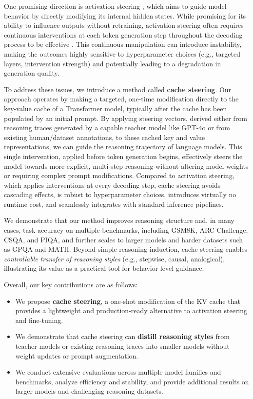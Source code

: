 \documentclass{article} %
\begin{document}
One promising direction is activation steering \citep{turner2308activation, panickssery2023steering}, which aims to guide model behavior by directly modifying its internal hidden states. While promising for its ability to influence outputs without retraining, activation steering often requires continuous interventions at each token generation step throughout the decoding process to be effective \citep{wehner2025taxonomy}. This continuous manipulation can introduce instability, making the outcomes highly sensitive to hyperparameter choices (e.g., targeted layers, intervention strength) and potentially leading to a degradation in generation quality.

To address these issues, we introduce a method called \textbf{cache steering}. Our approach operates by making a targeted, one-time modification directly to the key-value cache of a Transformer model, typically after the cache has been populated by an initial prompt. By applying steering vectors, derived either from reasoning traces generated by a capable teacher model like GPT-4o or from existing human/dataset annotations, to these cached key and value representations, we can guide the reasoning trajectory of language models. This single intervention, applied before token generation begins, effectively steers the model towards more explicit, multi-step reasoning without altering model weights or requiring complex prompt modifications. Compared to activation steering, which applies interventions at every decoding step, cache steering avoids cascading effects, is robust to hyperparameter choices, introduces virtually no runtime cost, and seamlessly integrates with standard inference pipelines.

We demonstrate that our method improves reasoning structure and, in many cases, task accuracy on multiple benchmarks, including GSM8K, ARC-Challenge, CSQA, and PIQA, and further scales to larger models and harder datasets such as GPQA and MATH. Beyond simple reasoning induction, cache steering enables \textit{controllable transfer of reasoning styles} (e.g., stepwise, causal, analogical), illustrating its value as a practical tool for behavior-level guidance.

Overall, our key contributions are as follows:
\begin{itemize}
    \item We propose \textbf{cache steering}, a one-shot modification of the KV cache that provides a lightweight and production-ready alternative to activation steering and fine-tuning.
    \item We demonstrate that cache steering can \textbf{distill reasoning styles} from teacher models or existing reasoning traces into smaller models without weight updates or prompt augmentation.
    \item We conduct extensive evaluations across multiple model families and benchmarks, analyze efficiency and stability, and provide additional results on larger models and challenging reasoning datasets.
\end{itemize}
\end{document}
